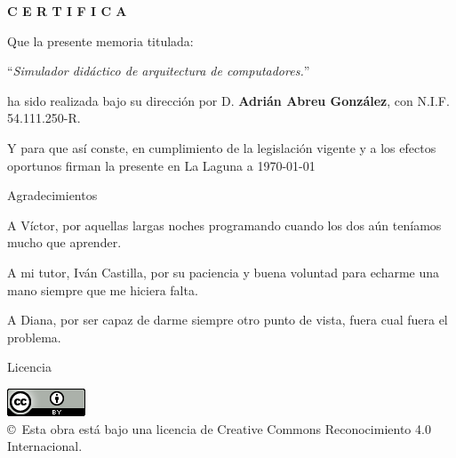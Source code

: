 \documentclass[spanish,a4paper,14pt,oneside]{extreport}
\begin{document}
\bigskip
\bigskip
{\bf C E R T I F I C A}

\bigskip
\bigskip
\bigskip
Que la presente memoria titulada:

\bigskip
``{\it Simulador didáctico de arquitectura de computadores.}''

\bigskip
\bigskip
\bigskip

\noindent ha sido realizada bajo su dirección por D. {\bf Adrián Abreu González},
con N.I.F. 54.111.250-R.

\bigskip
\bigskip

Y para que así conste, en cumplimiento de la legislación vigente y a los efectos
oportunos firman la presente en La Laguna a \today

\newpage
\thispagestyle{empty}

{ \flushright

\begin{LARGE}
Agradecimientos
\end{LARGE}

\bigskip
\hspace{3mm}
A Víctor, por aquellas largas noches programando cuando los dos aún teníamos mucho que aprender.

\bigskip
\hspace{3mm}
A mi tutor, Iván Castilla, por su paciencia y buena voluntad para echarme una mano siempre que 
me hiciera falta.

\bigskip
\hspace{3mm}
A Diana, por ser capaz de darme siempre otro punto de vista, fuera cual fuera el problema.

}

\newpage

\begin{huge}
Licencia
\end{huge}

\bigskip
\begin{center}
\includegraphics[scale=1.5]{images/by_88x31}\\[10mm]
{\Large \copyright~Esta obra está bajo una licencia de Creative Commons Reconocimiento 4.0 Internacional.
}
\end{center}
\end{document}
